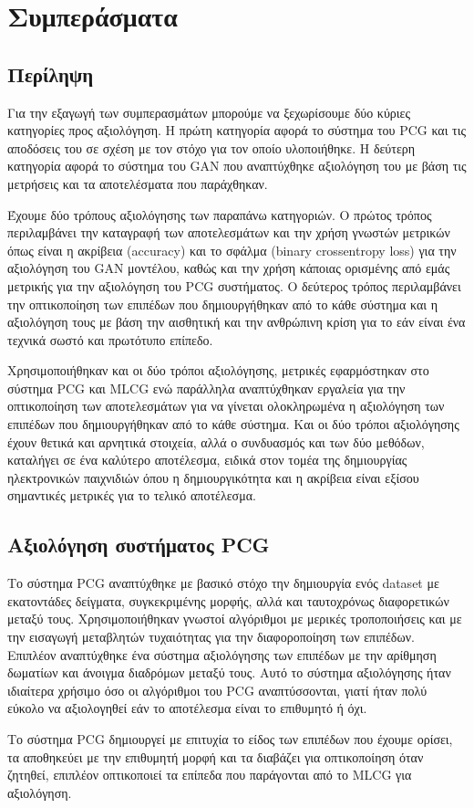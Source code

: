 \chapter{Συμπεράσματα}

\section{Περίληψη}
\par
Για την εξαγωγή των συμπερασμάτων μπορούμε να ξεχωρίσουμε δύο κύριες κατηγορίες προς αξιολόγηση. Η πρώτη κατηγορία αφορά το σύστημα του PCG και τις αποδόσεις του σε σχέση με τον στόχο για τον οποίο υλοποιήθηκε. Η δεύτερη κατηγορία αφορά το σύστημα του GAN που αναπτύχθηκε αξιολόγηση του με βάση τις μετρήσεις και τα αποτελέσματα που παράχθηκαν.
\par
Έχουμε δύο τρόπους αξιολόγησης των παραπάνω κατηγοριών. Ο πρώτος τρόπος περιλαμβάνει την καταγραφή των αποτελεσμάτων και την χρήση γνωστών μετρικών όπως είναι η ακρίβεια (accuracy) και το σφάλμα (binary crossentropy loss) για την αξιολόγηση του GAN μοντέλου, καθώς και την χρήση κάποιας ορισμένης από εμάς μετρικής για την αξιολόγηση του PCG συστήματος. Ο δεύτερος τρόπος περιλαμβάνει την οπτικοποίηση των επιπέδων που δημιουργήθηκαν από το κάθε σύστημα και η αξιολόγηση τους με βάση την αισθητική και την ανθρώπινη κρίση για το εάν είναι ένα τεχνικά σωστό και πρωτότυπο επίπεδο.
\par
Χρησιμοποιήθηκαν και οι δύο τρόποι αξιολόγησης, μετρικές εφαρμόστηκαν στο σύστημα PCG και MLCG ενώ παράλληλα αναπτύχθηκαν εργαλεία για την οπτικοποίηση των αποτελεσμάτων για να γίνεται ολοκληρωμένα η αξιολόγηση των επιπέδων που δημιουργήθηκαν από το κάθε σύστημα. Και οι δύο τρόποι αξιολόγησης έχουν θετικά και αρνητικά στοιχεία, αλλά ο συνδυασμός και των δύο μεθόδων, καταλήγει σε ένα καλύτερο αποτέλεσμα, ειδικά στον τομέα της δημιουργίας ηλεκτρονικών παιχνιδιών όπου η δημιουργικότητα και η ακρίβεια είναι εξίσου σημαντικές μετρικές για το τελικό αποτέλεσμα.

\section{Αξιολόγηση συστήματος PCG}
\par
Το σύστημα PCG αναπτύχθηκε με βασικό στόχο την δημιουργία ενός dataset με εκατοντάδες δείγματα, συγκεκριμένης μορφής, αλλά και ταυτοχρόνως διαφορετικών μεταξύ τους. Χρησιμοποιήθηκαν γνωστοί αλγόριθμοι με μερικές τροποποιήσεις και με την εισαγωγή μεταβλητών τυχαιότητας για την διαφοροποίηση των επιπέδων. Επιπλέον αναπτύχθηκε ένα σύστημα αξιολόγησης των επιπέδων με την αρίθμηση δωματίων και άνοιγμα διαδρόμων μεταξύ τους. Αυτό το σύστημα αξιολόγησης ήταν ιδιαίτερα χρήσιμο όσο οι αλγόριθμοι του PCG αναπτύσσονται, γιατί ήταν πολύ εύκολο να αξιολογηθεί εάν το αποτέλεσμα είναι το επιθυμητό ή όχι.
\par
Το σύστημα PCG δημιουργεί με επιτυχία το είδος των επιπέδων που έχουμε ορίσει, τα αποθηκεύει με την επιθυμητή μορφή και τα διαβάζει για οπτικοποίηση όταν ζητηθεί, επιπλέον οπτικοποιεί τα επίπεδα που παράγονται από το MLCG για αξιολόγηση.



